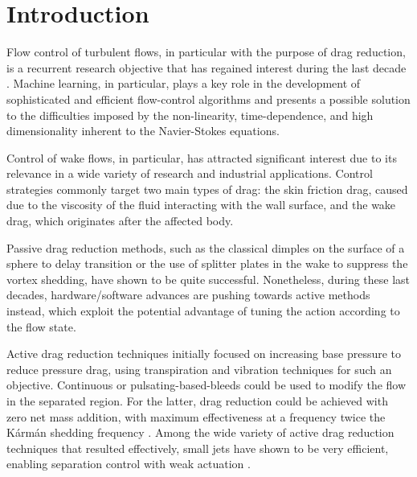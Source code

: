 
\section{Introduction}\label{s:Introduction}

Flow control of turbulent flows, in particular with the purpose of drag reduction, is a recurrent research objective that has regained interest during the last decade \citep{Noack2019control}. Machine learning, in particular, plays a key role in the development of sophisticated and efficient flow-control algorithms \citep{BruntonNoackKoumoutsakos2020} and presents a possible solution to the difficulties imposed by the non-linearity, time-dependence, and high dimensionality inherent to the Navier-Stokes equations.

Control of wake flows, in particular, has attracted significant interest due to its relevance in a wide variety of research and industrial applications. Control strategies commonly target two main types of drag: the skin friction drag, caused due to the viscosity of the fluid interacting with the wall surface, and the wake drag, which originates after the affected body.

Passive drag reduction methods, such as the classical dimples on the surface of a sphere \citep{Bearman1993dimples} to delay transition or the use of splitter plates in the wake \citep{Ozono1999splitter} to suppress the vortex shedding, have shown to be quite successful. Nonetheless, during these last decades, hardware/software advances are pushing towards active methods instead, which exploit the potential advantage of tuning the action according to the flow state. 

Active drag reduction techniques initially focused on increasing base pressure to reduce pressure drag, using transpiration and vibration techniques for such an objective. Continuous or pulsating-based-bleeds could be used to modify the flow in the separated region. For the latter, drag reduction could be achieved with zero net mass addition, with maximum effectiveness at a frequency twice the K\'arm\'an shedding frequency \citep{Williams1989}. Among the wide variety of active drag reduction techniques that resulted effectively, small jets have shown to be very efficient, enabling separation control with weak actuation \citep{glezer2011control}. 

